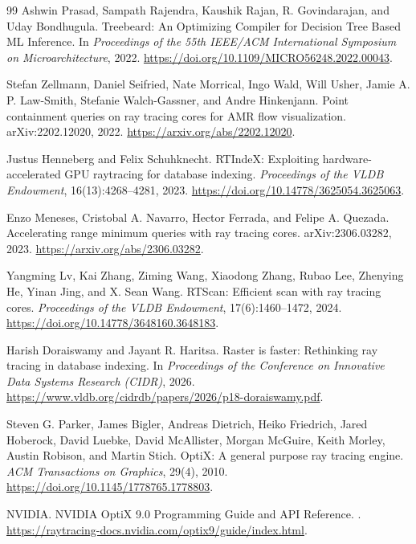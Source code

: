 \documentclass[11pt]{article}
\begin{document}
\begin{thebibliography}{99}
Ashwin Prasad, Sampath Rajendra, Kaushik Rajan, R. Govindarajan, and Uday
Bondhugula.
\newblock Treebeard: An Optimizing Compiler for Decision Tree Based ML
Inference.
\newblock In \emph{Proceedings of the 55th IEEE/ACM International Symposium on
Microarchitecture}, 2022.
\newblock \url{https://doi.org/10.1109/MICRO56248.2022.00043}.

Stefan Zellmann, Daniel Seifried, Nate Morrical, Ingo Wald, Will Usher,
Jamie A. P. Law-Smith, Stefanie Walch-Gassner, and Andre Hinkenjann.
\newblock Point containment queries on ray tracing cores for AMR flow
visualization.
\newblock arXiv:2202.12020, 2022.
\newblock \url{https://arxiv.org/abs/2202.12020}.

Justus Henneberg and Felix Schuhknecht.
\newblock RTIndeX: Exploiting hardware-accelerated GPU raytracing for database
indexing.
\newblock \emph{Proceedings of the VLDB Endowment}, 16(13):4268--4281, 2023.
\newblock \url{https://doi.org/10.14778/3625054.3625063}.

Enzo Meneses, Cristobal A. Navarro, Hector Ferrada, and Felipe A. Quezada.
\newblock Accelerating range minimum queries with ray tracing cores.
\newblock arXiv:2306.03282, 2023.
\newblock \url{https://arxiv.org/abs/2306.03282}.

Yangming Lv, Kai Zhang, Ziming Wang, Xiaodong Zhang, Rubao Lee, Zhenying He,
Yinan Jing, and X. Sean Wang.
\newblock RTScan: Efficient scan with ray tracing cores.
\newblock \emph{Proceedings of the VLDB Endowment}, 17(6):1460--1472, 2024.
\newblock \url{https://doi.org/10.14778/3648160.3648183}.

Harish Doraiswamy and Jayant R. Haritsa.
\newblock Raster is faster: Rethinking ray tracing in database indexing.
\newblock In \emph{Proceedings of the Conference on Innovative Data Systems
Research (CIDR)}, 2026.
\newblock \url{https://www.vldb.org/cidrdb/papers/2026/p18-doraiswamy.pdf}.

Steven G. Parker, James Bigler, Andreas Dietrich, Heiko Friedrich, Jared
Hoberock, David Luebke, David McAllister, Morgan McGuire, Keith Morley, Austin
Robison, and Martin Stich.
\newblock OptiX: A general purpose ray tracing engine.
\newblock \emph{ACM Transactions on Graphics}, 29(4), 2010.
\newblock \url{https://doi.org/10.1145/1778765.1778803}.

NVIDIA.
\newblock NVIDIA OptiX 9.0 Programming Guide and API Reference.
.
\newblock \url{https://raytracing-docs.nvidia.com/optix9/guide/index.html}.


\end{thebibliography}
\end{document}
